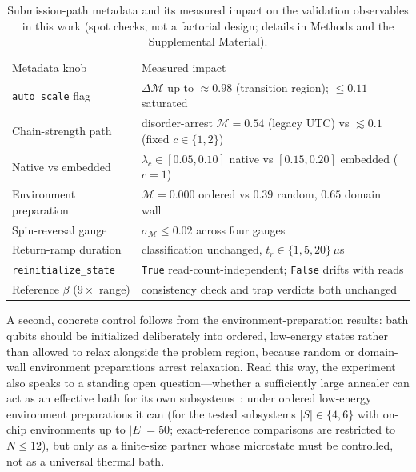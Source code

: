 \documentclass[aps,prapplied,reprint,superscriptaddress,floatfix,nofootinbib]{revtex4-2}
\begin{document}
\begin{table}[!htbp]
\centering
\caption{\label{tab:metadata}Submission-path metadata and its measured impact on the validation observables in this work (spot checks, not a factorial design; details in Methods and the Supplemental Material).}
\begin{ruledtabular}
\begin{tabular}{ll}
Metadata knob & Measured impact \\
\colrule
\texttt{auto\_scale} flag & $\Delta\mathcal{M}$ up to $\approx 0.98$ (transition region); $\le 0.11$ saturated \\
Chain-strength path & disorder-arrest $\mathcal{M}=0.54$ (legacy UTC) vs $\lesssim 0.1$ (fixed $c\in\{1,2\}$) \\
Native vs embedded & $\lambda_c\in[0.05,0.10]$ native vs $[0.15,0.20]$ embedded ($c=1$) \\
Environment preparation & $\mathcal{M}=0.000$ ordered vs $0.39$ random, $0.65$ domain wall \\
Spin-reversal gauge & $\sigma_\mathcal{M}\le 0.02$ across four gauges \\
Return-ramp duration & classification unchanged, $t_r\in\{1,5,20\}\,\mu$s \\
\texttt{reinitialize\_state} & \texttt{True} read-count-independent; \texttt{False} drifts with reads \\
Reference $\beta$ ($9\times$ range) & consistency check and trap verdicts both unchanged \\
\end{tabular}
\end{ruledtabular}
\end{table}
A second, concrete control follows from the environment-preparation results: bath qubits should be initialized deliberately into ordered, low-energy states rather than allowed to relax alongside the problem region, because random or domain-wall environment preparations arrest relaxation.
Read this way, the experiment also speaks to a standing open question---whether a sufficiently large annealer can act as an effective bath for its own subsystems~\cite{kendon2026qacm}: under ordered low-energy environment preparations it can (for the tested subsystems $|S|\in\{4,6\}$ with on-chip environments up to $|E|=50$; exact-reference comparisons are restricted to $N\le12$), but only as a finite-size partner whose microstate must be controlled, not as a universal thermal bath.
\end{document}
